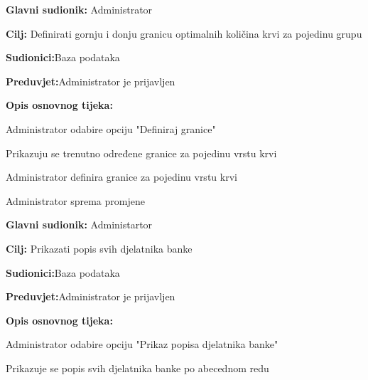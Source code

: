 \noindent {}
\begin{packed_item}
	
	\item \textbf{Glavni sudionik: }{Administrator}
	\item  \textbf{Cilj:} {Definirati gornju i donju granicu optimalnih količina krvi za pojedinu grupu}
	\item  \textbf{Sudionici:}{Baza podataka}
	\item  \textbf{Preduvjet:}{Administrator je prijavljen}
	\item  \textbf{Opis osnovnog tijeka:}
	
	\item[] \begin{packed_enum}
		
		\item {Administrator odabire opciju "Definiraj granice"}
		\item {Prikazuju se trenutno određene granice za pojedinu vrstu krvi} 
		\item {Administrator definira granice za pojedinu vrstu krvi}
		\item {Administrator sprema promjene}
		
	\end{packed_enum}
\end{packed_item}

\noindent {}
\begin{packed_item}
	
	\item \textbf{Glavni sudionik: }{Administartor}
	\item  \textbf{Cilj:} {Prikazati popis svih djelatnika banke}
	\item  \textbf{Sudionici:}{Baza podataka} 
	\item  \textbf{Preduvjet:}{Administrator je prijavljen}
	\item  \textbf{Opis osnovnog tijeka:}
	
	\item[] \begin{packed_enum}
		
		\item {Administrator odabire opciju "Prikaz popisa djelatnika banke"}
		\item {Prikazuje se popis svih djelatnika banke po abecednom redu}
		\end{packed_enum}
\end{packed_item}

